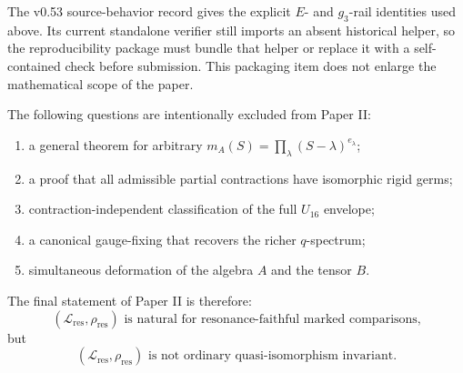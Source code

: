 \documentclass[11pt]{amsart}
\begin{document}
The v0.53 source-behavior record gives the explicit \(E\)- and \(g_3\)-rail identities used above.  Its current standalone verifier still imports an absent historical helper, so the reproducibility package must bundle that helper or replace it with a self-contained check before submission.  This packaging item does not enlarge the mathematical scope of the paper.

The following questions are intentionally excluded from Paper II:

\begin{enumerate}[label=(\arabic*)]
\item a general theorem for arbitrary \(m_A(S)=\prod_\lambda(S-\lambda)^{e_\lambda}\);
\item a proof that all admissible partial contractions have isomorphic rigid germs;
\item contraction-independent classification of the full \(U_{16}\) envelope;
\item a canonical gauge-fixing that recovers the richer \(q\)-spectrum;
\item simultaneous deformation of the algebra \(A\) and the tensor \(B\).
\end{enumerate}

The final statement of Paper II is therefore:
\[
\boxed{
(\mathcal L_{\mathrm{res}},\rho_{\mathrm{res}})
\text{ is natural for resonance-faithful marked comparisons,}
}
\]
but
\[
\boxed{
(\mathcal L_{\mathrm{res}},\rho_{\mathrm{res}})
\text{ is not ordinary quasi-isomorphism invariant.}}
\]
\end{document}
